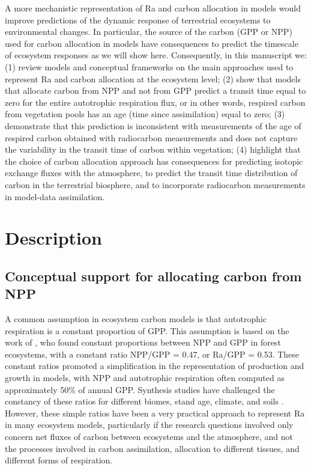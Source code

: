 \documentclass[12pt, a4paper]{article}
\begin{document}
A more mechanistic representation of Ra and carbon allocation in models would improve predictions of the dynamic response of terrestrial ecosystems to environmental changes. In particular, the source of the carbon (GPP or NPP) used for carbon allocation in models have consequences to predict the timescale of ecosystem responses as we will show here. 
Consequently, in this manuscript we: (1) review models and conceptual frameworks on the main approaches used to represent Ra and carbon allocation at the ecosystem level; (2) show that models that allocate carbon from NPP and not from GPP predict a transit time equal to zero for the entire autotrophic respiration flux, or in other words, respired carbon from vegetation pools has an age (time since assimilation) equal to zero; (3) demonstrate that this prediction is inconsistent with measurements of the age of respired carbon obtained with radiocarbon measurements and does not capture the variability in the transit time of carbon within vegetation; (4) highlight that the choice of carbon allocation approach has consequences for predicting isotopic exchange fluxes with the atmosphere, to predict the transit time distribution of carbon in the terrestrial biosphere, and to incorporate radiocarbon measurements in model-data assimilation. 

\section{Description}
\subsection{Conceptual support for allocating carbon from NPP}
A common assumption in ecosystem carbon models is that autotrophic respiration is a constant proportion of GPP. This assumption is based on the work of \citet{Waring1998}, who found constant proportions between NPP and GPP in forest ecosystems, with a constant ratio NPP/GPP = 0.47, or Ra/GPP = 0.53. These constant ratios  promoted  a simplification in the representation of production and growth in models, with NPP and autotrophic respiration often computed as approximately 50\% of annual GPP. Synthesis studies have challenged the constancy of these ratios for different biomes, stand age, climate, and soils \citep{DeLucia2007, Collalti2019}. However, these simple ratios have been a very practical approach to represent Ra in many ecosystem models, particularly if the research questions involved only concern net fluxes of carbon between ecosystems and the atmosphere, and not the processes involved in carbon assimilation, allocation to different tissues, and different forms of respiration.
\end{document}
